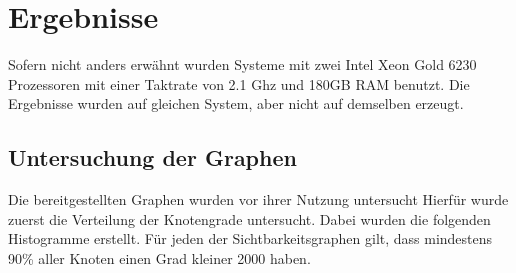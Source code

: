 \chapter{Ergebnisse}

Sofern nicht anders erwähnt wurden Systeme mit zwei Intel Xeon Gold 6230 Prozessoren mit einer Taktrate von 2.1 Ghz und 180GB RAM benutzt.
Die Ergebnisse wurden auf gleichen System, aber nicht auf demselben erzeugt.

\section{Untersuchung der Graphen}

Die bereitgestellten Graphen wurden vor ihrer Nutzung untersucht
Hierfür wurde zuerst die Verteilung der Knotengrade untersucht.
Dabei wurden die folgenden Histogramme erstellt.
Für jeden der Sichtbarkeitsgraphen gilt, dass mindestens 90\% aller Knoten einen Grad kleiner \num{2000} haben.

